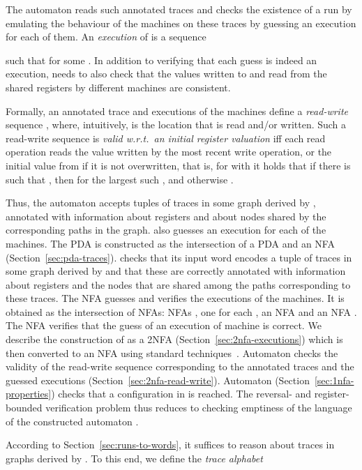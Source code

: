 The automaton  reads such annotated traces and checks the existence of a run
by emulating the behaviour of the machines on these traces by guessing an execution
for each of them. 
An \emph{execution} of  is a sequence  
 
such that 
for some .
In addition to verifying that each guess is indeed an execution,
 needs to also check that the values written to and read from
the shared registers by different machines are consistent. 

Formally, an annotated trace and executions of the machines  define a
\emph{read-write} sequence , 
where, intuitively,  is the location that is read and/or written.
Such a read-write sequence  is \emph{valid w.r.t.\ an initial register valuation 
} iff each read operation reads the value
written by the most recent write operation, or the initial value from  if it is not overwritten,
that is, for  with  it holds that 
if there is  such that , then 
for the largest such , and otherwise .

Thus, the automaton  accepts tuples of traces in some graph derived by , annotated with information about registers and about nodes shared by the corresponding paths in the graph. 
 also guesses an execution for each of the  machines. 
The PDA  is constructed as the intersection of a PDA  and an NFA  (Section~\ref{sec:pda-traces}). 
 checks that its input word encodes a tuple of traces in some graph derived by  and that these are correctly annotated with information about registers and the nodes that are shared among the paths corresponding to these traces. 
The NFA  guesses and verifies the executions of the machines. It is obtained as the intersection of  NFAs:
 NFAs , one for each , an NFA  and an NFA .
The NFA  verifies that the guess of an execution of machine  is correct.
We describe the construction of  as a 2NFA (Section~\ref{sec:2nfa-executions}) which is then converted to an NFA using standard techniques~\cite{HopcroftUllman}.
Automaton  checks the validity of the read-write sequence corresponding to the annotated traces and the guessed executions  (Section~\ref{sec:2nfa-read-write}). 
Automaton  (Section~\ref{sec:1nfa-properties}) checks that a configuration in  is reached.
The reversal- and register-bounded verification problem thus reduces to checking emptiness of the language of the constructed automaton .

According to Section~\ref{sec:runs-to-words}, it suffices to reason about  traces in graphs derived by .  To this end, we define the \emph{trace alphabet}

